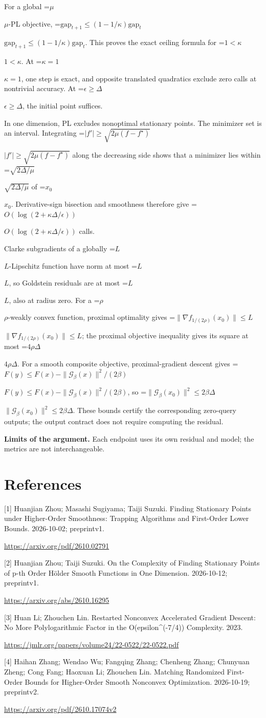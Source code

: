 \documentclass[10pt,a4paper]{article}
\newcommand{\AtlasMath}[1]{\par\begingroup\centering\setbox0=\hbox{$\displaystyle #1$}\ifdim\wd0>1.4\linewidth\typeout{ATLAS WIDE FORMULA: \the\wd0}\fi\ifdim\wd0>\linewidth\resizebox{\linewidth}{!}{\box0}\else\box0\fi\par\endgroup}
\newcommand{\AtlasInlineMath}[1]{\begingroup\setbox0=\hbox{$#1$}\ifdim\wd0>.4\linewidth\endgroup\AtlasMath{#1}\else\endgroup$#1$\fi}
\begin{document}
For a global \AtlasInlineMath{\mu}-PL objective,
\AtlasInlineMath{\mathrm{gap}_{t+1}\le(1-1/\kappa)\mathrm{gap}_t}.
This proves the exact ceiling formula for \AtlasInlineMath{1<\kappa}. At \AtlasInlineMath{\kappa=1}, one step is exact, and opposite translated quadratics exclude zero calls at nontrivial accuracy. At \AtlasInlineMath{\epsilon\ge\Delta}, the initial point suffices.

In one dimension, PL excludes nonoptimal stationary points. The minimizer set is an interval. Integrating
\AtlasInlineMath{|f'|\ge\sqrt{2\mu(f-f^\star)}}
along the decreasing side shows that a minimizer lies within \AtlasInlineMath{\sqrt{2\Delta/\mu}} of \AtlasInlineMath{x_0}. Derivative-sign bisection and smoothness therefore give \AtlasInlineMath{O(\log(2+\kappa\Delta/\epsilon))} calls.

Clarke subgradients of a globally \AtlasInlineMath{L}-Lipschitz function have norm at most \AtlasInlineMath{L}, so Goldstein residuals are at most \AtlasInlineMath{L}, also at radius zero. For a \AtlasInlineMath{\rho}-weakly convex function, proximal optimality gives
\AtlasInlineMath{\|\nabla f_{1/(2\rho)}(x_0)\|\le L}; the proximal objective inequality gives its square at most \AtlasInlineMath{4\rho\Delta}.
For a smooth composite objective, proximal-gradient descent gives
\AtlasInlineMath{F(y)\le F(x)-\|\mathcal G_\beta(x)\|^2/(2\beta)},
so \AtlasInlineMath{\|\mathcal G_\beta(x_0)\|^2\le2\beta\Delta}.
These bounds certify the corresponding zero-query outputs; the output contract does not require computing the residual.

\textbf{Limits of the argument.} Each endpoint uses its own residual and model; the metrics are not interchangeable.

\section{References}
[1] Huanjian Zhou; Masashi Sugiyama; Taiji Suzuki. Finding Stationary Points under Higher-Order Smoothness: Trapping Algorithms and First-Order Lower Bounds. 2026-10-02; preprintv1.

\url{https://arxiv.org/pdf/2610.02791}

[2] Huanjian Zhou; Taiji Suzuki. On the Complexity of Finding Stationary Points of p-th Order Hölder Smooth Functions in One Dimension. 2026-10-12; preprintv1.

\url{https://arxiv.org/abs/2610.16295}

[3] Huan Li; Zhouchen Lin. Restarted Nonconvex Accelerated Gradient Descent: No More Polylogarithmic Factor in the O(epsilon\textasciicircum{}(-7/4)) Complexity. 2023.

\url{https://jmlr.org/papers/volume24/22-0522/22-0522.pdf}

[4] Haihan Zhang; Wendao Wu; Fangqing Zhang; Chenheng Zhang; Chunyuan Zheng; Cong Fang; Haoxuan Li; Zhouchen Lin. Matching Randomized First-Order Bounds for Higher-Order Smooth Nonconvex Optimization. 2026-10-19; preprintv2.

\url{https://arxiv.org/pdf/2610.17074v2}
\end{document}
